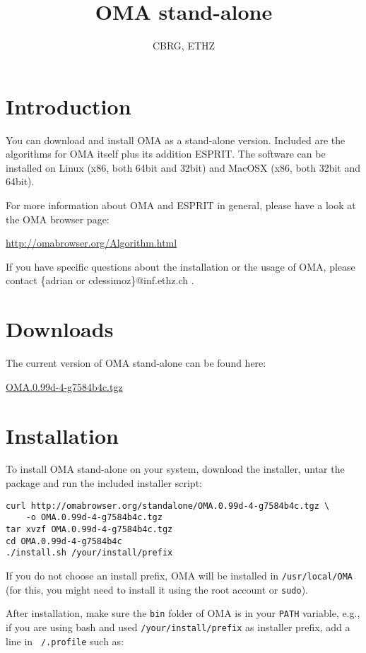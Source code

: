 \documentclass{scrartcl}
\title{OMA stand-alone}
\author{CBRG, ETHZ}
\date{
}
\begin{document}
\maketitle

\section{Introduction}
\noindent You can download and install OMA as a stand-alone
            version. Included are the algorithms for OMA itself plus its 
            addition ESPRIT. The software can be installed on Linux (x86, 
            both 64bit and 32bit) and MacOSX (x86, both 32bit and 64bit).

\noindent For more information about OMA and ESPRIT in general, 
            please have a look at the OMA browser page:

\noindent \href{http://omabrowser.org/Algorithm.html}{http://omabrowser.org/Algorithm.html}

\noindent If you have specific questions about the installation 
            or the usage of OMA, please contact 
            \{adrian or cdessimoz\}@inf.ethz.ch .
\section{Downloads}
\noindent The current version of OMA stand-alone can be 
                found here:

\noindent \href{http://omabrowser.org/standalone/OMA.0.99d-4-g7584b4c.tgz}{OMA.0.99d-4-g7584b4c.tgz}
\section{Installation}
\noindent To install OMA stand-alone on your system, download
            the installer, untar the package and run the included installer
            script:

\noindent \begin{verbatim}
curl http://omabrowser.org/standalone/OMA.0.99d-4-g7584b4c.tgz \
    -o OMA.0.99d-4-g7584b4c.tgz
tar xvzf OMA.0.99d-4-g7584b4c.tgz
cd OMA.0.99d-4-g7584b4c
./install.sh /your/install/prefix
\end{verbatim}


\noindent If you do not choose an install prefix, OMA will be 
            installed in \texttt{/usr/local/OMA} (for this, you might need 
            to install it using the root account or \texttt{sudo}).

\noindent After installation, make sure the \texttt{bin} folder of OMA is in your \texttt{PATH} variable, e.g., if
            you are using bash and used \texttt{/your/install/prefix} as
            installer prefix, add a line in \texttt{~/.profile} such as:
\end{document}
